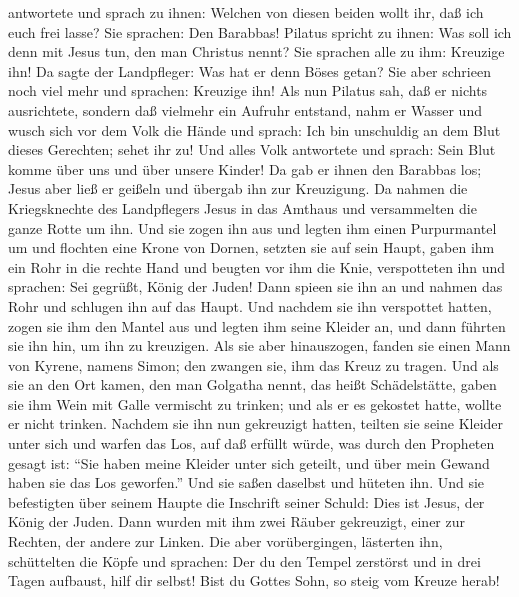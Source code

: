 antwortete und sprach zu ihnen: Welchen von diesen beiden wollt ihr, daß
ich euch frei lasse? Sie sprachen: Den Barabbas!  Pilatus
spricht zu ihnen: Was soll ich denn mit Jesus tun, den man Christus
nennt? Sie sprachen alle zu ihm: Kreuzige ihn!  Da sagte
der Landpfleger: Was hat er denn Böses getan? Sie aber schrieen noch
viel mehr und sprachen: Kreuzige ihn!  Als nun Pilatus
sah, daß er nichts ausrichtete, sondern daß vielmehr ein Aufruhr
entstand, nahm er Wasser und wusch sich vor dem Volk die Hände und
sprach: Ich bin unschuldig an dem Blut dieses Gerechten; sehet ihr zu!
 Und alles Volk antwortete und sprach: Sein Blut komme
über uns und über unsere Kinder!  Da gab er ihnen den
Barabbas los; Jesus aber ließ er geißeln und übergab ihn zur Kreuzigung.
 Da nahmen die Kriegsknechte des Landpflegers Jesus in
das Amthaus und versammelten die ganze Rotte um ihn.  Und
sie zogen ihn aus und legten ihm einen Purpurmantel um 
und flochten eine Krone von Dornen, setzten sie auf sein Haupt, gaben
ihm ein Rohr in die rechte Hand und beugten vor ihm die Knie,
verspotteten ihn und sprachen: Sei gegrüßt, König der Juden!
 Dann spieen sie ihn an und nahmen das Rohr und schlugen
ihn auf das Haupt.  Und nachdem sie ihn verspottet
hatten, zogen sie ihm den Mantel aus und legten ihm seine Kleider an,
und dann führten sie ihn hin, um ihn zu kreuzigen.  Als
sie aber hinauszogen, fanden sie einen Mann von Kyrene, namens Simon;
den zwangen sie, ihm das Kreuz zu tragen.  Und als sie an
den Ort kamen, den man Golgatha nennt, das heißt Schädelstätte,
 gaben sie ihm Wein mit Galle vermischt zu trinken; und
als er es gekostet hatte, wollte er nicht trinken. 
Nachdem sie ihn nun gekreuzigt hatten, teilten sie seine Kleider unter
sich und warfen das Los, auf daß erfüllt würde, was durch den Propheten
gesagt ist: ``Sie haben meine Kleider unter sich geteilt, und über mein
Gewand haben sie das Los geworfen.''  Und sie saßen
daselbst und hüteten ihn.  Und sie befestigten über
seinem Haupte die Inschrift seiner Schuld: Dies ist Jesus, der König der
Juden.  Dann wurden mit ihm zwei Räuber gekreuzigt, einer
zur Rechten, der andere zur Linken.  Die aber
vorübergingen, lästerten ihn, schüttelten die Köpfe  und
sprachen: Der du den Tempel zerstörst und in drei Tagen aufbaust, hilf
dir selbst! Bist du Gottes Sohn, so steig vom Kreuze herab!
